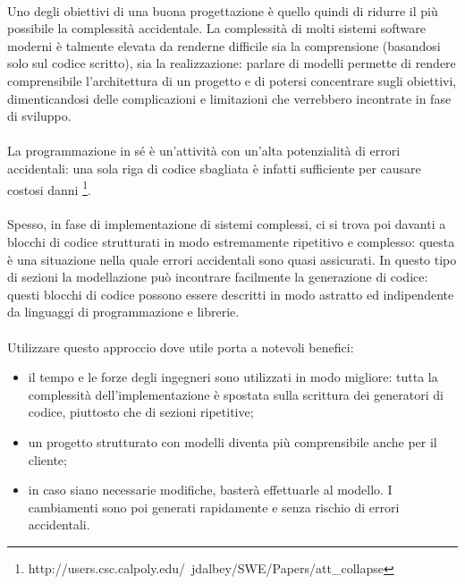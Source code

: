 \documentclass[a4paper, 12pt]{report}
\begin{document}
      \paragraph*{}
      Uno degli obiettivi di una buona progettazione è quello quindi di ridurre il più possibile la complessità accidentale.
      La complessità di molti sistemi software moderni è talmente elevata da renderne difficile sia la comprensione (basandosi solo sul codice scritto), sia la realizzazione: parlare di modelli permette di rendere comprensibile l'architettura di un progetto e di potersi concentrare sugli obiettivi, dimenticandosi delle complicazioni e limitazioni che verrebbero incontrate in fase di sviluppo.
      \paragraph*{}
      La programmazione in sé è un'attività con un'alta potenzialità di errori accidentali: una sola riga di codice sbagliata è infatti sufficiente per causare costosi danni \footnote{http://users.csc.calpoly.edu/~jdalbey/SWE/Papers/att_collapse}.
      \paragraph*{}
      Spesso, in fase di implementazione di sistemi complessi, ci si trova poi davanti a blocchi di codice strutturati in modo estremamente ripetitivo e complesso: questa è una situazione nella quale errori accidentali sono quasi assicurati.
      In questo tipo di sezioni la modellazione può incontrare facilmente la generazione di codice: questi blocchi di codice possono essere descritti in modo astratto ed indipendente da linguaggi di programmazione e librerie.
      \paragraph*{}
      Utilizzare questo approccio dove utile porta a notevoli benefici:
      \begin{itemize}
        \item il tempo e le forze degli ingegneri sono utilizzati in modo migliore: tutta la complessità dell'implementazione è spostata sulla scrittura dei generatori di codice, piuttosto che di sezioni ripetitive;
        \item un progetto strutturato con modelli diventa più comprensibile anche per il cliente;
        \item in caso siano necessarie modifiche, basterà effettuarle al modello. I cambiamenti sono poi generati rapidamente e senza rischio di errori accidentali.
      \end{itemize}
\end{document}
